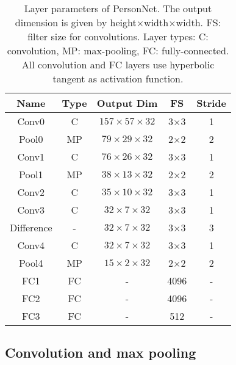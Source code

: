 \documentclass[10pt,journal,twocolumn]{IEEEtran}
\begin{document}
\begin{table}[t]
  \centering
  \caption{Layer parameters of PersonNet. The output dimension is given by height$\times$width$\times$width. FS: filter size for convolutions. Layer types: C: convolution, MP: max-pooling, FC: fully-connected.  All convolution and FC layers use hyperbolic tangent as activation function.}  \label{tab:layer}{
  \begin{tabular}{c|c|c|c|c}
  \hline
\hline
    Name  & Type  &  Output Dim & FS  & Stride \\
  \hline\hline
   Conv0  & C & $157\times57\times32$  & 3$\times3$ & 1 \\
   Pool0  & MP &  $79\times 29\times 32$ & 2$\times2$ & 2 \\
   Conv1  & C & $76\times 26\times 32$ & 3$\times$3 & 1 \\
   Pool1  & MP & $38\times 13\times 32$ & 2$\times$2 & 2 \\
   Conv2  & C &  $35\times 10\times 32$ &  3$\times$3  & 1 \\
   Conv3  & C & $32\times 7\times 32$ & 3$\times$3 &  1\\
   Difference  & - & $32\times 7\times 32$ & 3$\times$3 &  3\\
   Conv4  & C & $32\times 7\times 32$ & 3$\times$3 &  1\\
   Pool4  & MP & $15\times 2\times 32$ & 2$\times$2 &  2\\
\hline
   FC1   & FC  & -  & 4096 &  - \\
   FC2   & FC  & -  & 4096  & -  \\
   FC3   & FC  & - &  512 & -  \\
  \hline
  \end{tabular}
  }
\end{table}\subsection{Convolution and max pooling}
\end{document}
